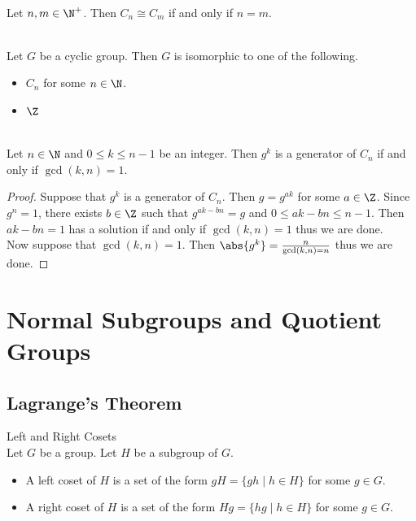 \documentclass[a4paper]{article}
\begin{document}
\begin{prp}{}{}\\
Let $n,m\in\N^+$. Then $C_n\cong C_m$ if and only if $n=m$. 
\end{prp}

\begin{lmm}{}{}\\
Let $G$ be a cyclic group. Then $G$ is isomorphic to one of the following. 
\begin{itemize}
\item $C_n$ for some $n\in\N$. 
\item $\Z$
\end{itemize}
\end{lmm}

\begin{prp}{}{}\\
Let $n\in\N$ and $0\leq k\leq n-1$ be an integer. Then $g^k$ is a generator of $C_n$ if and only if $\gcd(k,n)=1$. 
\begin{proof}
Suppose that $g^k$ is a generator of $C_n$. Then $g=g^{ak}$ for some $a\in\Z$. Since $g^n=1$, there exists $b\in\Z$ such that $g^{ak-bn}=g$ and $0\leq ak-bn\leq n-1$. Then $ak-bn=1$ has a solution if and only if $\gcd(k,n)=1$ thus we are done. \\

Now suppose that $\gcd(k,n)=1$. Then $\abs{g^k}=\frac{n}{\gcd(k,n)=n}$ thus we are done. 
\end{proof}
\end{prp}

\pagebreak
\section{Normal Subgroups and Quotient Groups}
\subsection{Lagrange's Theorem}
\begin{defn}{Left and Right Cosets}{}\\
Let $G$ be a group. Let $H$ be a subgroup of $G$. 
\begin{itemize}
\item A left coset of $H$ is a set of the form $gH=\{gh\;|\;h\in H\}$ for some $g\in G$. 
\item A right coset of $H$ is a set of the form $Hg=\{hg\;|\;h\in H\}$ for some $g\in G$. 
\end{itemize}
\end{defn}
\end{document}
